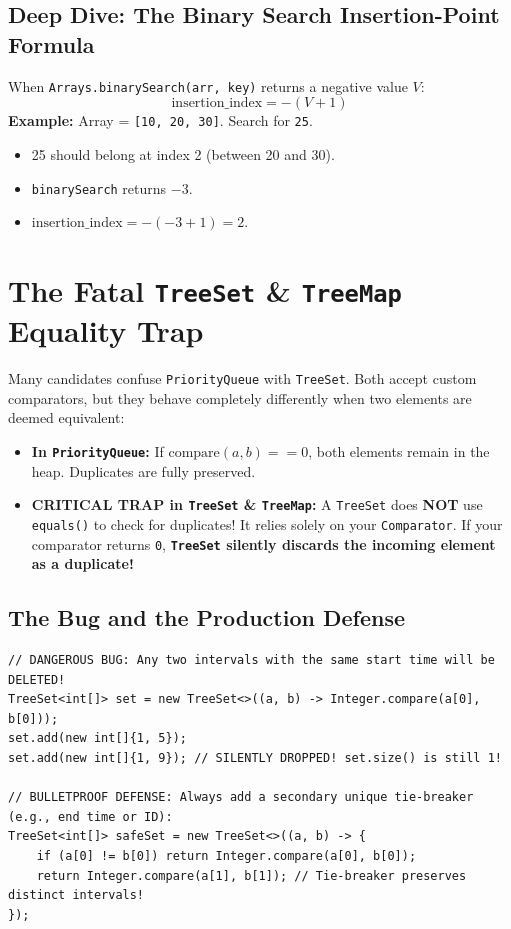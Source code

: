 \documentclass[10pt,journal,compsoc,onecolumn]{IEEEtran}
\begin{document}
\subsection{Deep Dive: The Binary Search Insertion-Point Formula}
When \texttt{Arrays.binarySearch(arr, key)} returns a negative value $V$:
\begin{equation}
\text{insertion\_index} = -(V + 1)
\end{equation}
\textbf{Example:} Array = \texttt{[10, 20, 30]}. Search for \texttt{25}.
\begin{itemize}
    \item 25 should belong at index 2 (between 20 and 30).
    \item \texttt{binarySearch} returns $-3$.
    \item $\text{insertion\_index} = -(-3 + 1) = 2$.
\end{itemize}

\section{The Fatal \texttt{TreeSet} \& \texttt{TreeMap} Equality Trap}
\label{sec:treeset_trap}

Many candidates confuse \texttt{PriorityQueue} with \texttt{TreeSet}. Both accept custom comparators, but they behave completely differently when two elements are deemed equivalent:

\begin{itemize}
    \item \textbf{In \texttt{PriorityQueue}:} If $\text{compare}(a, b) == 0$, both elements remain in the heap. Duplicates are fully preserved.
    \item \textbf{\textbf{CRITICAL TRAP} in \texttt{TreeSet} \& \texttt{TreeMap}:} A \texttt{TreeSet} does \textbf{NOT} use \texttt{equals()} to check for duplicates! It relies solely on your \texttt{Comparator}. If your comparator returns \texttt{0}, \textbf{\texttt{TreeSet} silently discards the incoming element as a duplicate!}
\end{itemize}

\subsection{The Bug and the Production Defense}
\begin{verbatim}
// DANGEROUS BUG: Any two intervals with the same start time will be DELETED!
TreeSet<int[]> set = new TreeSet<>((a, b) -> Integer.compare(a[0], b[0]));
set.add(new int[]{1, 5});
set.add(new int[]{1, 9}); // SILENTLY DROPPED! set.size() is still 1!

// BULLETPROOF DEFENSE: Always add a secondary unique tie-breaker (e.g., end time or ID):
TreeSet<int[]> safeSet = new TreeSet<>((a, b) -> {
    if (a[0] != b[0]) return Integer.compare(a[0], b[0]);
    return Integer.compare(a[1], b[1]); // Tie-breaker preserves distinct intervals!
});
\end{verbatim}
\end{document}

